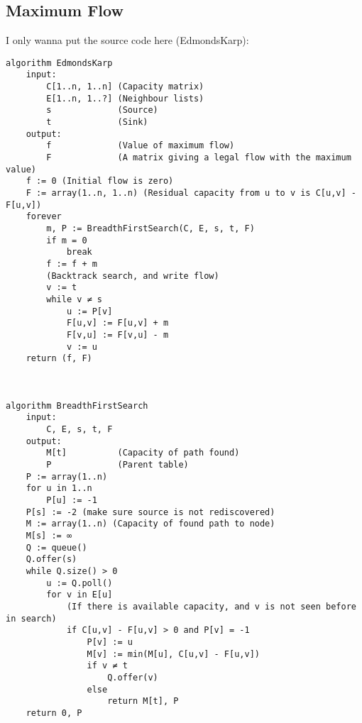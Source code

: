 \subsection{Maximum Flow}
I only wanna put the source code here (EdmondsKarp):
\begin{verbatim}
algorithm EdmondsKarp
    input:
        C[1..n, 1..n] (Capacity matrix)
        E[1..n, 1..?] (Neighbour lists)
        s             (Source)
        t             (Sink)
    output:
        f             (Value of maximum flow)
        F             (A matrix giving a legal flow with the maximum value)
    f := 0 (Initial flow is zero)
    F := array(1..n, 1..n) (Residual capacity from u to v is C[u,v] - F[u,v])
    forever
        m, P := BreadthFirstSearch(C, E, s, t, F)
        if m = 0
            break
        f := f + m
        (Backtrack search, and write flow)
        v := t
        while v ≠ s
            u := P[v]
            F[u,v] := F[u,v] + m
            F[v,u] := F[v,u] - m
            v := u
    return (f, F)
	
	
	
algorithm BreadthFirstSearch
    input:
        C, E, s, t, F
    output:
        M[t]          (Capacity of path found)
        P             (Parent table)
    P := array(1..n)
    for u in 1..n
        P[u] := -1
    P[s] := -2 (make sure source is not rediscovered)
    M := array(1..n) (Capacity of found path to node)
    M[s] := ∞
    Q := queue()
    Q.offer(s)
    while Q.size() > 0
        u := Q.poll()
        for v in E[u]
            (If there is available capacity, and v is not seen before in search)
            if C[u,v] - F[u,v] > 0 and P[v] = -1
                P[v] := u
                M[v] := min(M[u], C[u,v] - F[u,v])
                if v ≠ t
                    Q.offer(v)
                else
                    return M[t], P
    return 0, P
\end{verbatim}
	
